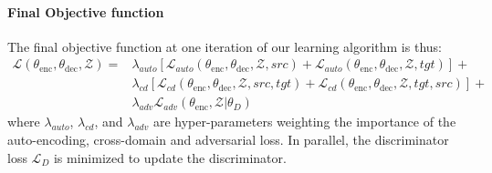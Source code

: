 \paragraph{Final Objective function}
The final objective function at one iteration of our learning algorithm is thus:
\begin{equation}
\begin{aligned}
    \mathcal{L}(\theta_\mathrm{enc},\theta_\mathrm{dec},\mathcal{Z}) = &
        \lambda_{auto} [ \mathcal{L}_{auto}(\theta_\mathrm{enc},\theta_\mathrm{dec},\mathcal{Z},src) +  \mathcal{L}_{auto}(\theta_\mathrm{enc},\theta_\mathrm{dec},\mathcal{Z},tgt) ] +\\ 
        &\lambda_{cd} [\mathcal{L}_{cd}(\theta_\mathrm{enc},\theta_\mathrm{dec},\mathcal{Z},src,tgt) + \mathcal{L}_{cd}(\theta_\mathrm{enc},\theta_\mathrm{dec},\mathcal{Z},tgt,src)] +\\
        &\lambda_{adv} \mathcal{L}_{adv}(\theta_\mathrm{enc},\mathcal{Z} | \theta_D) \label{eq:loss}
        \end{aligned}
\end{equation}
where $\lambda_{auto}$, $\lambda_{cd}$, and $\lambda_{adv}$ are hyper-parameters weighting the importance of the auto-encoding, cross-domain and adversarial loss. In parallel, the discriminator loss $\mathcal{L}_D$ is minimized to update the discriminator.
